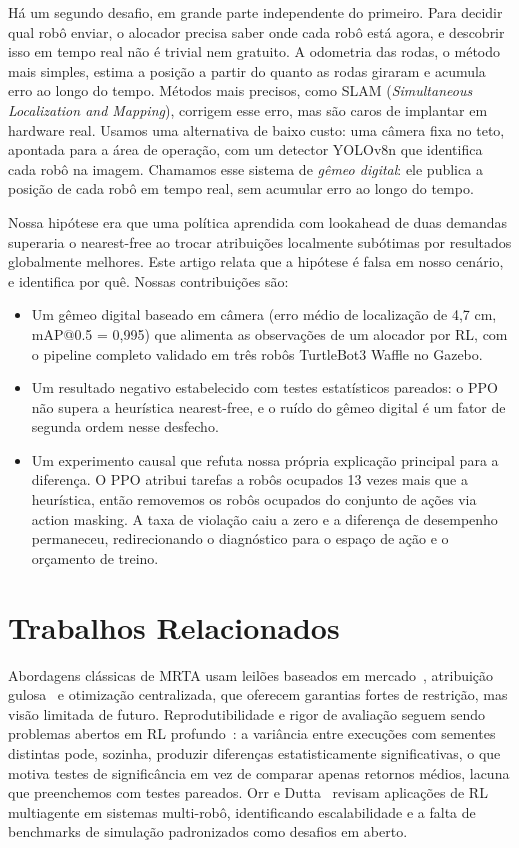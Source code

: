 \documentclass[conference]{IEEEtran}
\begin{document}
Há um segundo desafio, em grande parte independente do primeiro. Para decidir qual robô enviar, o alocador precisa saber onde cada robô está agora, e descobrir isso em tempo real não é trivial nem gratuito. A odometria das rodas, o método mais simples, estima a posição a partir do quanto as rodas giraram e acumula erro ao longo do tempo. Métodos mais precisos, como SLAM (\textit{Simultaneous Localization and Mapping}), corrigem esse erro, mas são caros de implantar em hardware real. Usamos uma alternativa de baixo custo: uma câmera fixa no teto, apontada para a área de operação, com um detector YOLOv8n que identifica cada robô na imagem. Chamamos esse sistema de \emph{gêmeo digital}: ele publica a posição de cada robô em tempo real, sem acumular erro ao longo do tempo.

Nossa hipótese era que uma política aprendida com lookahead de duas demandas superaria o nearest-free ao trocar atribuições localmente subótimas por resultados globalmente melhores. Este artigo relata que a hipótese é falsa em nosso cenário, e identifica por quê. Nossas contribuições são:

\begin{itemize}
\item Um gêmeo digital baseado em câmera (erro médio de localização de 4,7 cm, mAP@0.5 = 0,995) que alimenta as observações de um alocador por RL, com o pipeline completo validado em três robôs TurtleBot3 Waffle no Gazebo.
\item Um resultado negativo estabelecido com testes estatísticos pareados: o PPO não supera a heurística nearest-free, e o ruído do gêmeo digital é um fator de segunda ordem nesse desfecho.
\item Um experimento causal que refuta nossa própria explicação principal para a diferença. O PPO atribui tarefas a robôs ocupados 13 vezes mais que a heurística, então removemos os robôs ocupados do conjunto de ações via action masking. A taxa de violação caiu a zero e a diferença de desempenho permaneceu, redirecionando o diagnóstico para o espaço de ação e o orçamento de treino.
\end{itemize}

\section{Trabalhos Relacionados}

Abordagens clássicas de MRTA usam leilões baseados em mercado~\cite{dias2006market}, atribuição gulosa~\cite{gerkey2004formal} e otimização centralizada, que oferecem garantias fortes de restrição, mas visão limitada de futuro. Reprodutibilidade e rigor de avaliação seguem sendo problemas abertos em RL profundo~\cite{henderson2018deep}: a variância entre execuções com sementes distintas pode, sozinha, produzir diferenças estatisticamente significativas, o que motiva testes de significância em vez de comparar apenas retornos médios, lacuna que preenchemos com testes pareados. Orr e Dutta~\cite{orr2023survey} revisam aplicações de RL multiagente em sistemas multi-robô, identificando escalabilidade e a falta de benchmarks de simulação padronizados como desafios em aberto.
\end{document}

